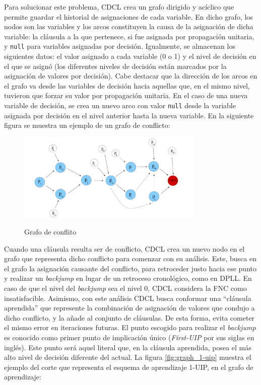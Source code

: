 Para solucionar este problema, CDCL crea un grafo dirigido y ac\'iclico que permite guardar el historial de asignaciones de cada variable. En dicho grafo, los nodos son las variables y los arcos constituyen la causa de la asignaci\'on de dicha variable: la cl\'ausula a la que pertenece, si fue asignada por propagaci\'on unitaria, y \texttt{null} para variables asignadas por decisi\'on. Igualmente, se almacenan los siguientes datos: el valor asignado a cada variable (0 o 1) y el nivel de decisi\'on en el que se asign\'o (los diferentes niveles de decisi\'on est\'an marcados por la asignaci\'on de valores por decisi\'on). Cabe destacar que la direcci\'on de los arcos en el grafo va desde las variables de decisi\'on hacia aquellas que, en el mismo nivel, tuvieron que forzar su valor por propagaci\'on unitaria. En el caso de una nueva variable de decisi\'on, se crea un nuevo arco con valor \texttt{null} desde la variable asignada por decisi\'on en el nivel anterior hasta la nueva variable. En la siguiente figura se muestra un ejemplo de un grafo de conflicto:

\begin{figure}[ht]
    \centering
    \includegraphics[width=0.8\textwidth]{Graphics/conflict_graph.png}
    \caption{Grafo de conflito}
    \cite{oliveras2009dpll_cdcl}
    \label{fig:conflict_graph}
\end{figure}

Cuando una cl\'ausula resulta ser de conflicto, CDCL crea un nuevo nodo en el grafo que representa dicho conflicto para comenzar con su an\'alisis. Este, busca en el grafo la asignaci\'on causante del conflicto, para retroceder justo hacia ese punto y realizar un \textit{backjump} en lugar de un retroceso cronol\'ogico, como en DPLL. En caso de que el nivel del \textit{backjump} sea el nivel 0, CDCL considera la FNC como insatisfacible. Asimismo, con este an\'alisis CDCL busca conformar una ``cl\'ausula aprendida'' que represente la combinaci\'on de asignaci\'on de valores que condujo a dicho conflicto, y la a\~nade al conjunto de cl\'ausulas. De esta forma, evita cometer el mismo error en iteraciones futuras. El punto escogido para realizar el \textit{backjump} es conocido como primer punto de implicaci\'on \'unico (\textit{First-UIP} por sus siglas en ingl\'es). Este punto ser\'a aquel literal que, en la cl\'ausula aprendida, posea el m\'as alto nivel de decisi\'on diferente del actual. La figura \ref{fig:graph_1-uip} muestra el ejemplo del corte que representa el esquema de aprendizaje 1-UIP, en el grafo de aprendizaje:

